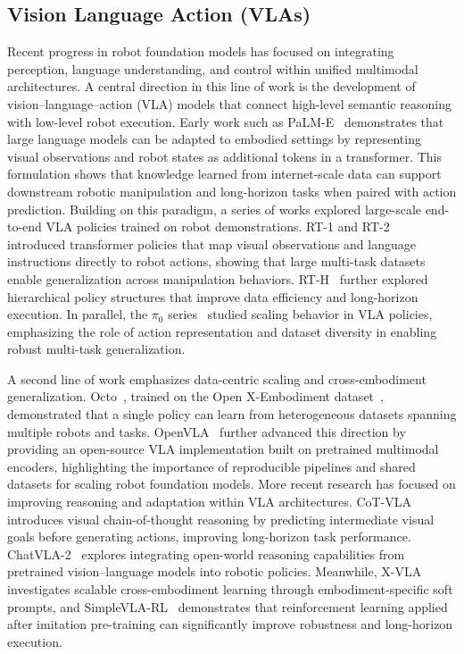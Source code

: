 \documentclass{article}
\begin{document}
\subsection{Vision Language Action (VLAs)}
Recent progress in robot foundation models has focused on integrating perception, language understanding, and control within unified multimodal architectures. A central direction in this line of work is the development of vision–language–action (VLA) models that connect high-level semantic reasoning with low-level robot execution. Early work such as PaLM-E~\citep{driess2023palm} demonstrates that large language models can be adapted to embodied settings by representing visual observations and robot states as additional tokens in a transformer. This formulation shows that knowledge learned from internet-scale data can support downstream robotic manipulation and long-horizon tasks when paired with action prediction. Building on this paradigm, a series of works explored large-scale end-to-end VLA policies trained on robot demonstrations. RT-1 and RT-2~\citep{brohan2023rt1, zitkovich2023rt2} introduced transformer policies that map visual observations and language instructions directly to robot actions, showing that large multi-task datasets enable generalization across manipulation behaviors. RT-H~\citep{belkhale2024rth} further explored hierarchical policy structures that improve data efficiency and long-horizon execution. In parallel, the $\pi_0$ series~\citep{black2025pi0} studied scaling behavior in VLA policies, emphasizing the role of action representation and dataset diversity in enabling robust multi-task generalization.

A second line of work emphasizes data-centric scaling and cross-embodiment generalization. Octo~\citep{ghosh2024octo}, trained on the Open X-Embodiment dataset~\citep{o2024open}, demonstrated that a single policy can learn from heterogeneous datasets spanning multiple robots and tasks. OpenVLA~\citep{openvla2025} further advanced this direction by providing an open-source VLA implementation built on pretrained multimodal encoders, highlighting the importance of reproducible pipelines and shared datasets for scaling robot foundation models. More recent research has focused on improving reasoning and adaptation within VLA architectures. CoT-VLA~\citep{zhao2025cotvla} introduces visual chain-of-thought reasoning by predicting intermediate visual goals before generating actions, improving long-horizon task performance. ChatVLA-2~\citep{zhou2025chatvla2} explores integrating open-world reasoning capabilities from pretrained vision–language models into robotic policies. Meanwhile, X-VLA~\citep{zheng2026xvla} investigates scalable cross-embodiment learning through embodiment-specific soft prompts, and SimpleVLA-RL~\citep{li2026simplevlarl} demonstrates that reinforcement learning applied after imitation pre-training can significantly improve robustness and long-horizon execution.
\end{document}

